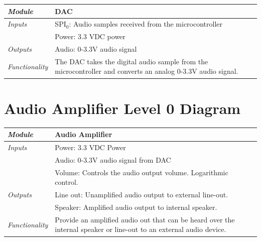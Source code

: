\documentclass{article}
\begin{document}
\begin{tabular}{|p{1in}|p{5in}|}
\hline
\emph{Module} & DAC \\
\hline
\emph{Inputs}& SPI$_0$: Audio samples received from the microcontroller\\
	     & Power: 3.3 VDC power\\
\hline
\emph{Outputs}& Audio: 0-3.3V audio signal \\ 
\hline
\emph{Functionality}& The DAC takes the digital audio sample from the microcontroller and converts an analog 0-3.3V audio signal.\\
\hline
\end{tabular}

\section{Audio Amplifier Level 0 Diagram}

\begin{tabular}{|p{1in}|p{5in}|}
\hline
\emph{Module} & Audio Amplifier \\
\hline
\emph{Inputs} & Power: 3.3 VDC Power\\
	      & Audio: 0-3.3V audio signal from DAC\\
	      & Volume: Controls the audio output volume. Logarithmic control.\\
\hline
\emph{Outputs}& Line out: Unamplified audio output to external line-out.\\ 
	      & Speaker: Amplified audio output to internal speaker.\\
\hline
\emph{Functionality}& Provide an amplified audio out that can be heard over the internal speaker or line-out to an external audio device.\\
\hline
\end{tabular}
\end{document}

